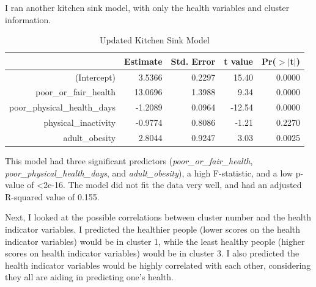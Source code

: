 \documentclass[12pt,twoside]{amherstthesis}
\begin{document}
  I ran another kitchen sink model, with only the health variables and
  cluster information.
  
  \begin{Shaded}
  \begin{Highlighting}[]
  \StringTok{ }\OperatorTok{~}
  \end{Highlighting}
  \end{Shaded}
  
  \begin{table}[ht]
  \centering
  \begin{tabular}{rrrrr}
    \hline
   & Estimate & Std. Error & t value & Pr($>$$|$t$|$) \\ 
    \hline
  (Intercept) & 3.5366 & 0.2297 & 15.40 & 0.0000 \\ 
    poor\_or\_fair\_health & 13.0696 & 1.3988 & 9.34 & 0.0000 \\ 
    poor\_physical\_health\_days & -1.2089 & 0.0964 & -12.54 & 0.0000 \\ 
    physical\_inactivity & -0.9774 & 0.8086 & -1.21 & 0.2270 \\ 
    adult\_obesity & 2.8044 & 0.9247 & 3.03 & 0.0025 \\ 
     \hline
  \end{tabular}
  \caption{Updated Kitchen Sink Model} 
  \end{table}
  
  This model had three significant predictors
  (\emph{poor\_or\_fair\_health}, \emph{poor\_physical\_health\_days}, and
  \emph{adult\_obesity}), a high F-statistic, and a low p-value of
  \textless{}2e-16. The model did not fit the data very well, and had an
  adjusted R-squared value of 0.155.
  
  Next, I looked at the possible correlations between cluster number and
  the health indicator variables. I predicted the healthier people (lower
  scores on the health indicator variables) would be in cluster 1, while
  the least healthy people (higher scores on health indicator variables)
  would be in cluster 3. I also predicted the health indicator variables
  would be highly correlated with each other, considering they all are
  aiding in predicting one's health.
  
  \begin{Shaded}
  \begin{Highlighting}[]
  \end{Highlighting}
  \end{Shaded}
  
\end{document}
